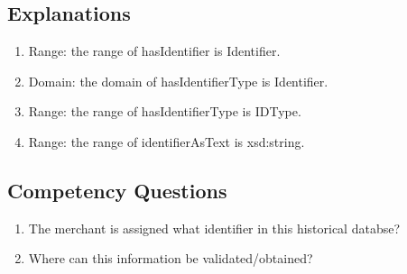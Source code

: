 \subsection{Explanations}
\label{exp:Identifier}
\begin{enumerate}
\item Range: the range of \textsf{hasIdentifier} is \textsf{Identifier}.
\item Domain: the domain of \textsf{hasIdentifierType} is \textsf{Identifier}.
\item Range: the range of \textsf{hasIdentifierType} is \textsf{IDType}.
\item Range: the range of \textsf{identifierAsText} is \textsf{xsd:string}.
\end{enumerate}

\subsection{Competency Questions}
\label{cqs:Identifier}
\begin{enumerate}[CQ1.]
\item The merchant is assigned what identifier in this historical databse?
\item Where can this information be validated/obtained?
\end{enumerate}

\newpage
